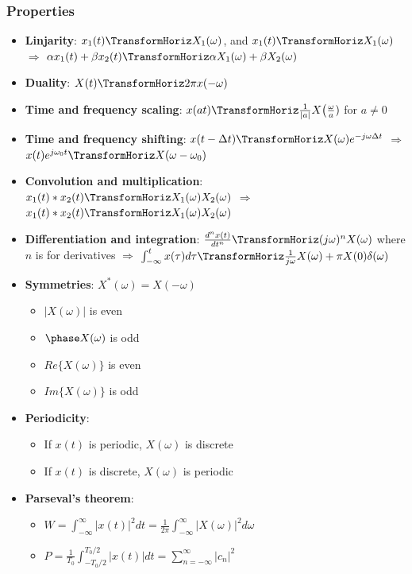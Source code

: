 \subsubsection{Properties}
\begin{itemize}
    \item \textbf{Linjarity}: $x_1(t) \TransformHoriz X_1(\omega)$, and
     $x_1(t) \TransformHoriz X_1(\omega)$ $\Rightarrow$
     $\alpha x_1(t) + \beta x_2(t) \TransformHoriz \alpha X_1(\omega) + \beta X_2(\omega)$
    \item \textbf{Duality}: $X(t) \TransformHoriz 2\pi x(-\omega)$
    \item \textbf{Time and frequency scaling}: $x(at) \TransformHoriz \frac{1}{|a|}X\big(\frac{\omega}{a})$ for $a\neq0$
    \item \textbf{Time and frequency shifting}: $x(t-\Delta t) \TransformHoriz X(\omega)e^{-j\omega\Delta t}$
    $\Rightarrow$ $x(t)e^{j\omega_0 t} \TransformHoriz X(\omega-\omega_0)$
    \item \textbf{Convolution and multiplication}: $x_1(t)*x_2(t) \TransformHoriz X_1(\omega)X_2(\omega)$ 
    $\Rightarrow$ $x_1(t)*x_2(t) \TransformHoriz X_1(\omega)X_2(\omega)$
    \item \textbf{Differentiation and integration}: $\frac{d^nx(t)}{dt^n} \TransformHoriz (j\omega)^n X(\omega)$ 
    where $n$ is for derivatives \newline
    $\Rightarrow$ $\int_{-\infty}^t x(\tau)d\tau \TransformHoriz \frac{1}{j\omega} X(\omega) + \pi X(0)\delta(\omega)$
    \item \textbf{Symmetries}: $X^*(\omega) = X(-\omega)$
    \begin{itemize}
        \item $|X(\omega)|$ is even
        \item $\phase X(\omega)$ is odd
        \item $Re\{X(\omega)\}$ is even
        \item $Im\{X(\omega)\}$ is odd
    \end{itemize}
    \item \textbf{Periodicity}:
    \begin{itemize}
        \item If $x(t)$ is periodic, $X(\omega)$ is discrete
        \item If $x(t)$ is discrete, $X(\omega)$ is periodic
    \end{itemize}
    \item \textbf{Parseval's theorem}: 
    \begin{itemize}
        \item $W=\int_{-\infty}^{\infty} |x(t)|^2 dt = \frac{1}{2\pi} \int_{-\infty}^{\infty} |X(\omega)|^2d\omega$ \newline
        \item $P=\frac{1}{T_0}\int_{-T_0/2}^{T_0/2} |x(t)|dt = \sum_{n=-\infty}^{\infty} |c_n|^2$
    \end{itemize}
\end{itemize}

